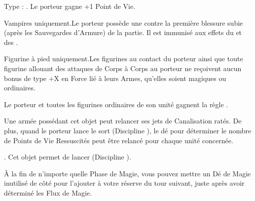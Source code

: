 \endpricelist

\armymagicalarmour

\startpricelist

 Type : \platearmour{}. Le porteur gagne +1 Point de Vie.

\endpricelist

\armytalismans

\startpricelist

 Vampires uniquement.\newline Le porteur possède une  contre la première blessure subie (après les Sauvegardes d'Armure) de la partie. Il est immunisé aux effets du  et des \multiplewounds{}{}.

 Figurine à pied uniquement.\newline Les figurines au contact du porteur ainsi que toute figurine allouant des attaques de Corps à Corps au porteur ne reçoivent aucun bonus de type +X en Force lié à leurs Armes, qu'elles soient magiques ou ordinaires.

\endpricelist

\armyenchanteditems

\startpricelist

 Le porteur et toutes les figurines ordinaires de son unité gagnent la règle \distracting{}.

\endpricelist

\armyarcaneitems

\startpricelist

 Une armée possédant cet objet peut relancer ses jets de Canalisation ratés. De plus, quand le porteur lance le sort \necromancysignaturespell{} (Discipline \necromancy{}), le dé pour déterminer le nombre de Points de Vie Ressuscités peut être relancé pour chaque unité concernée.

 . Cet objet permet de lancer \necromancyspelltwo{} (Discipline \necromancy{}).

 À la fin de n'importe quelle Phase de Magie, vous pouvez mettre un Dé de Magie inutilisé de côté pour l'ajouter à votre réserve du tour suivant, juste après avoir déterminé les Flux de Magie.

\endpricelist

\armymagicalbanners

